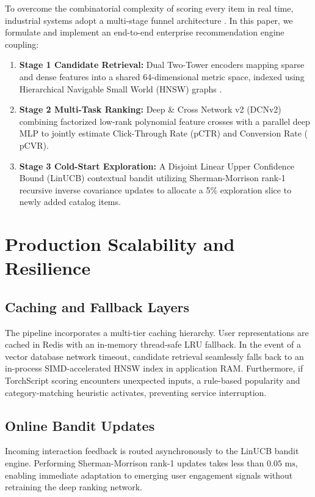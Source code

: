 \documentclass[conference]{IEEEtran}
\begin{document}
To overcome the combinatorial complexity of scoring every item in real time, industrial systems adopt a multi-stage funnel architecture \cite{covington2016deep}. In this paper, we formulate and implement an end-to-end enterprise recommendation engine coupling:
\begin{enumerate}
    \item \textbf{Stage 1 Candidate Retrieval:} Dual Two-Tower encoders mapping sparse and dense features into a shared 64-dimensional metric space, indexed using Hierarchical Navigable Small World (HNSW) graphs \cite{malkov2020efficient}.
    \item \textbf{Stage 2 Multi-Task Ranking:} Deep \& Cross Network v2 (DCNv2) \cite{wang2021dcn} combining factorized low-rank polynomial feature crosses with a parallel deep MLP to jointly estimate Click-Through Rate ($\text{pCTR}$) and Conversion Rate ($\text{pCVR}$).
    \item \textbf{Stage 3 Cold-Start Exploration:} A Disjoint Linear Upper Confidence Bound (LinUCB) contextual bandit \cite{li2010contextual,auer2002finite} utilizing Sherman-Morrison rank-1 recursive inverse covariance updates \cite{sherman1950adjustment} to allocate a 5\% exploration slice to newly added catalog items.
\end{enumerate}





\section{Production Scalability and Resilience}
\subsection{Caching and Fallback Layers}
The pipeline incorporates a multi-tier caching hierarchy. User representations are cached in Redis with an in-memory thread-safe LRU fallback. In the event of a vector database network timeout, candidate retrieval seamlessly falls back to an in-process SIMD-accelerated HNSW index in application RAM. Furthermore, if TorchScript scoring encounters unexpected inputs, a rule-based popularity and category-matching heuristic activates, preventing service interruption.

\subsection{Online Bandit Updates}
Incoming interaction feedback is routed asynchronously to the LinUCB bandit engine. Performing Sherman-Morrison rank-1 updates takes less than $0.05\text{ ms}$, enabling immediate adaptation to emerging user engagement signals without retraining the deep ranking network.
\end{document}
